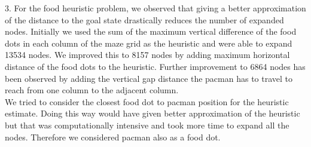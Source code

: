 \documentclass[11pt]{article}
\begin{document}
3. For the food heuristic problem, we observed that giving a better approximation of the distance to the goal state drastically reduces the number of expanded nodes. Initially we used the sum of the  maximum vertical difference of the food dots  in each column  of the maze grid  as the  heuristic and were able to expand 13534 nodes. We improved this to 8157 nodes by adding  maximum horizontal distance of the food dots to the heuristic. Further improvement to 6864 nodes has been observed by adding the vertical gap distance the pacman has to travel to reach from one column to the  adjacent column.\\
  We tried to consider the closest food dot to pacman position for the heuristic estimate. Doing this way would have given better approximation of the heuristic  but that was computationally intensive and took more time to expand all the nodes. Therefore we considered pacman also as a food dot. 
\end{document}
